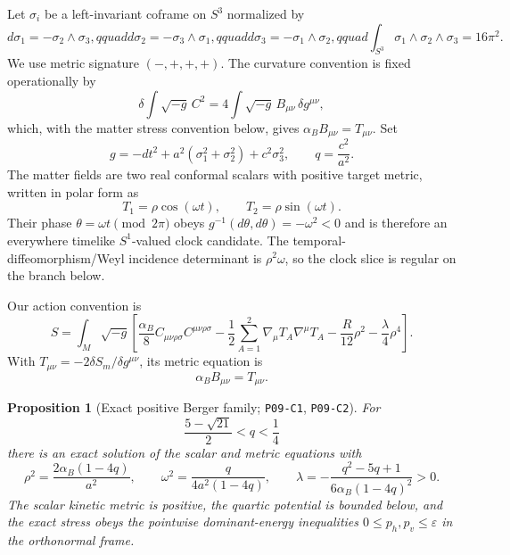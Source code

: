 \documentclass[11pt]{article}
\newtheorem{proposition}[theorem]{Proposition}
\theoremstyle{definition}
\theoremstyle{remark}
\newcommand{\claimid}[1]{\texttt{#1}}
\begin{document}
Let $\sigma_i$ be a left-invariant coframe on $S^3$ normalized by
\begin{equation}\label{eq:MC}
 d\sigma_1=-\sigma_2\wedge\sigma_3,qquad
 d\sigma_2=-\sigma_3\wedge\sigma_1,qquad
 d\sigma_3=-\sigma_1\wedge\sigma_2,qquad
 \int_{S^3}\sigma_1\wedge\sigma_2\wedge\sigma_3=16\pi^2.
\end{equation}
We use metric signature $(-,+,+,+)$.  The curvature convention is fixed
operationally by
\begin{equation}\label{eq:curvature-convention}
 \delta\!\int\sqrt{-g}\,C^2
 =4\int\sqrt{-g}\,B_{\mu\nu}\,\delta g^{\mu\nu},
\end{equation}
which, with the matter stress convention below, gives
$\alpha_BB_{\mu\nu}=T_{\mu\nu}$.  Set
\begin{equation}\label{eq:berger}
 g=-dt^2+a^2(\sigma_1^2+\sigma_2^2)+c^2\sigma_3^2,
 \qquad q=\frac{c^2}{a^2}.
\end{equation}
The matter fields are two real conformal scalars with positive target metric,
written in polar form as
\begin{equation}\label{eq:clock}
 T_1=\rho\cos(\omega t),\qquad
 T_2=\rho\sin(\omega t).
\end{equation}
Their phase $\theta=\omega t\pmod{2\pi}$ obeys
$g^{-1}(d\theta,d\theta)=-\omega^2<0$ and is therefore an everywhere
timelike $S^1$-valued clock candidate.  The temporal-diffeomorphism/Weyl incidence determinant
is $\rho^2\omega$, so the clock slice is regular on the branch below.

Our action convention is
\begin{equation}\label{eq:action}
 S=\int_M\!\sqrt{-g}\left[
 \frac{\alpha_B}{8}C_{\mu\nu\rho\sigma}C^{\mu\nu\rho\sigma}
 -\frac12\sum_{A=1}^2\nabla_\mu T_A\nabla^\mu T_A
 -\frac{R}{12}\rho^2-\frac{\lambda}{4}\rho^4
 \right].
\end{equation}
With $T_{\mu\nu}=-2\delta S_m/\delta g^{\mu\nu}$, its metric equation is
\begin{equation}\label{eq:bach-source}
 \alpha_B B_{\mu\nu}=T_{\mu\nu}.
\end{equation}

\begin{proposition}[Exact positive Berger family; \claimid{P09-C1},
\claimid{P09-C2}]\label{prop:background}
For
\begin{equation}\label{eq:q-range}
 \frac{5-\sqrt{21}}2<q<\frac14
\end{equation}
there is an exact solution of the scalar and metric equations with
\begin{equation}\label{eq:branch}
 \rho^2=\frac{2\alpha_B(1-4q)}{a^2},\qquad
 \omega^2=\frac{q}{4a^2(1-4q)},\qquad
 \lambda=-\frac{q^2-5q+1}{6\alpha_B(1-4q)^2}>0.
\end{equation}
The scalar kinetic metric is positive, the quartic potential is bounded
below, and the exact stress obeys the pointwise dominant-energy inequalities
$0\leq p_h,p_v\leq\varepsilon$ in the orthonormal frame.
\end{proposition}
\end{document}
